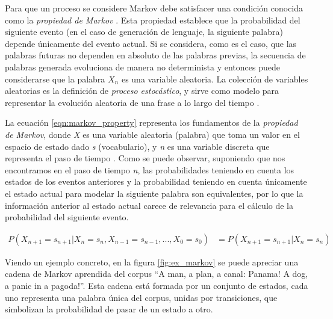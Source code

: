 Para que un proceso se considere Markov debe satisfacer una condición conocida como la \textit{propiedad de Markov} \citep{norris-1998}. Esta propiedad establece que la probabilidad del siguiente evento (en el caso de generación de lenguaje, la siguiente palabra) depende únicamente del evento actual. Si se considera, como es el caso, que las palabras futuras no dependen en absoluto de las palabras previas, la secuencia de palabras generada evoluciona de manera no determinista y entonces puede considerarse que la palabra $X_n$ es una variable aleatoria. La colección de variables aleatorias es la definición de \textit{proceso estocástico}, y sirve como modelo para representar la evolución aleatoria de una frase a lo largo del tiempo \citep{MoyotlHernndez2016MtodoPA}.

La ecuación \ref{eqn:markov_property} representa los fundamentos de la \textit{propiedad de Markov}, donde \textit{X} es una variable aleatoria (palabra) que toma un valor en el espacio de estado dado \textit{s} (vocabulario), y \textit{n} es una variable discreta que representa el paso de tiempo \citep{howell_2022}. Como se puede observar, suponiendo que nos encontramos en el paso de tiempo \textit{n}, las probabilidades teniendo en cuenta los estados de los eventos anteriores y la probabilidad teniendo en cuenta únicamente el estado actual para modelar la siguiente palabra son equivalentes, por lo que la información anterior al estado actual carece de relevancia para el cálculo de la probabilidad del siguiente evento.

\begin{equation}
\label{eqn:markov_property}
\begin{aligned}
P(X_{n+1} = s_{n+1}|X_{n} = s_{n}, X_{n-1} = s_{n-1}, ..., X_{0} = s_{0}) &= P(X_{n+1} = s_{n+1}|X_{n} = s_{n})
\end{aligned}
\end{equation}

Viendo un ejemplo concreto, en la figura \ref{fig:ex_markov} se puede apreciar una cadena de Markov aprendida del corpus ``A man, a plan, a canal: Panama! A dog, a panic in a pagoda!''. Esta cadena está formada por un conjunto de estados, cada uno representa una palabra única del corpus, unidas por transiciones, que simbolizan la probabilidad de pasar de un estado a otro. 


